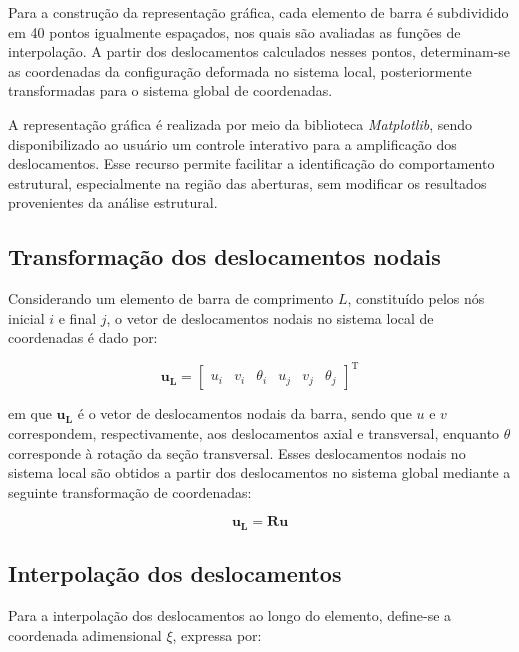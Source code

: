 Para a construção da representação gráfica, cada elemento de barra é subdividido em 40 pontos igualmente espaçados, nos quais são avaliadas as funções de interpolação. A partir dos deslocamentos calculados nesses pontos, determinam-se as coordenadas da configuração deformada no sistema local, posteriormente transformadas para o sistema global de coordenadas.

A representação gráfica é realizada por meio da biblioteca \textit{Matplotlib}, sendo disponibilizado ao usuário um controle interativo para a amplificação dos deslocamentos. Esse recurso permite facilitar a identificação do comportamento estrutural, especialmente na região das aberturas, sem modificar os resultados provenientes da análise estrutural.

\subsection{Transformação dos deslocamentos nodais}

Considerando um elemento de barra de comprimento $L$, constituído pelos nós inicial $i$ e final $j$, o vetor de deslocamentos nodais no sistema local de coordenadas é dado por:

\begin{equation}
    \mathbf{u_L} =
    \begin{bmatrix}
        u_i & v_i & \theta_i &
        u_j & v_j & \theta_j
    \end{bmatrix}^{\mathrm{T}}
    \label{eq:deformada_vetor_local}
\end{equation}

em que $\mathbf{u_L}$ é o vetor de deslocamentos nodais da barra, sendo que $u$ e $v$ correspondem, respectivamente, aos deslocamentos axial e transversal, enquanto $\theta$ corresponde à rotação da seção transversal. Esses deslocamentos nodais no sistema local são obtidos a partir dos deslocamentos no sistema global mediante a seguinte transformação de coordenadas:

\begin{equation}
    \mathbf{u_L} = \mathbf{R}\mathbf{u} 
    \label{eq:deformada_transformacao}
\end{equation}

\subsection{Interpolação dos deslocamentos}

Para a interpolação dos deslocamentos ao longo do elemento, define-se a coordenada adimensional $\xi$, expressa por:


